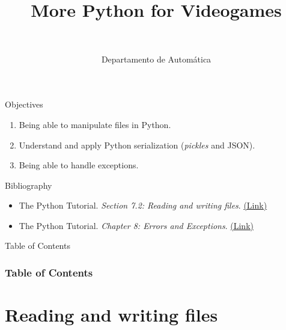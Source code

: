 \documentclass[10pt,compress]{beamer} %
\title[More Python for Videogames]{More Python for Videogames}
\author{\asignatura\\\carrera}
\institute{}
\date{Departamento de Automática}
\begin{document}
{\titlepageBlue
    \begin{frame}
        \titlepage
    \end{frame}
}

\institute{\asignatura}

\begin{frame}[plain]{}
	\begin{block}{Objectives}
		\begin{enumerate}
		\item Being able to manipulate files in Python.
		\item Understand and apply Python serialization (\textit{pickles} and JSON).
		\item Being able to handle exceptions.
		\end{enumerate}
	\end{block}

	\begin{block}{Bibliography}
		\begin{itemize}
			\item The Python Tutorial. \textit{Section 7.2: Reading and writing files}. \href{https://docs.python.org/3/tutorial/inputoutput.html\#reading-and-writing-files}{(Link)}
			\item The Python Tutorial. \textit{Chapter 8: Errors and Exceptions}. \href{https://docs.python.org/3/tutorial/errors.html}{(Link)}
		\end{itemize}
	\end{block}
\end{frame}

{
\begin{frame}[shrink]{Table of Contents}

 	\frametitle{Table of Contents}
  	\begin{multicols}{2}
  		\tableofcontents
    	\end{multicols}

\end{frame}
}


\section{Reading and writing files}
\end{document}
